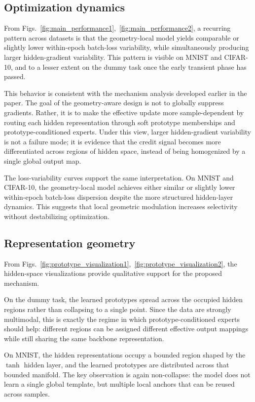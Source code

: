 \documentclass{article}
\theoremstyle{definition}
\theoremstyle{remark}
\begin{document}
\subsection{Optimization dynamics}
From Figs.~\ref{fig:main_performance1},~\ref{fig:main_performance2}, a recurring pattern across datasets is that the geometry-local model yields comparable or slightly lower within-epoch batch-loss variability, while simultaneously producing larger hidden-gradient variability. This pattern is visible on MNIST and CIFAR-10, and to a lesser extent on the dummy task once the early transient phase has passed.

This behavior is consistent with the mechanism analysis developed earlier in the paper. The goal of the geometry-aware design is not to globally suppress gradients. Rather, it is to make the effective update more sample-dependent by routing each hidden representation through soft prototype memberships and prototype-conditioned experts. Under this view, larger hidden-gradient variability is not a failure mode; it is evidence that the credit signal becomes more differentiated across regions of hidden space, instead of being homogenized by a single global output map.

The loss-variability curves support the same interpretation. On MNIST and CIFAR-10, the geometry-local model achieves either similar or slightly lower within-epoch batch-loss dispersion despite the more structured hidden-layer dynamics. This suggests that local geometric modulation increases selectivity without destabilizing optimization.

\subsection{Representation geometry}

From Figs.~\ref{fig:prototype_visualization1},~\ref{fig:prototype_visualization2}, the hidden-space visualizations provide qualitative support for the proposed mechanism.

On the dummy task, the learned prototypes spread across the occupied hidden regions rather than collapsing to a single point. Since the data are strongly multimodal, this is exactly the regime in which prototype-conditioned experts should help: different regions can be assigned different effective output mappings while still sharing the same backbone representation.

On MNIST, the hidden representations occupy a bounded region shaped by the $\tanh$ hidden layer, and the learned prototypes are distributed across that bounded manifold. The key observation is again non-collapse: the model does not learn a single global template, but multiple local anchors that can be reused across samples.
\end{document}
